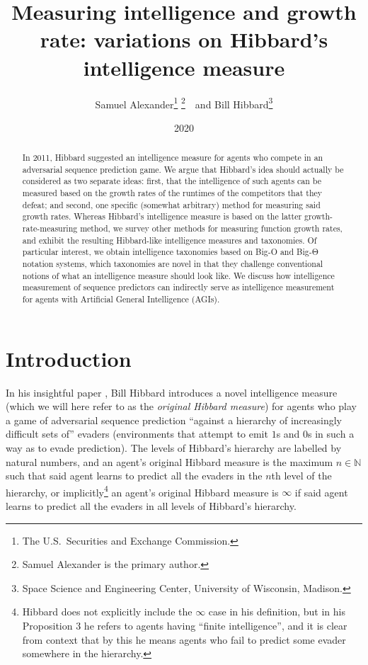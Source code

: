 \documentclass{article}
\title{Measuring intelligence and growth rate: variations on
Hibbard's intelligence measure}
\author{Samuel Alexander\thanks{The U.S.\ Securities and Exchange Commission.}
\thanks{Samuel Alexander is the primary author.}\ \ and Bill Hibbard\thanks{Space Science
and Engineering Center, University of Wisconsin, Madison.}}
\date{2020}
\begin{document}
\maketitle

\begin{abstract}
    In 2011, Hibbard suggested an intelligence measure for agents
    who compete in an adversarial sequence prediction game. We argue
    that Hibbard's idea should actually be considered as two separate
    ideas: first, that the intelligence of such agents can be measured
    based on the growth rates of the runtimes of the competitors that
    they defeat; and second, one specific (somewhat arbitrary) method for measuring said
    growth rates. Whereas Hibbard's intelligence measure is based on the latter
    growth-rate-measuring method, we survey
    other methods for measuring function
    growth rates, and exhibit the resulting Hibbard-like intelligence measures
    and taxonomies. Of particular interest, we obtain intelligence taxonomies
    based on Big-O and Big-Θ notation systems, which taxonomies
    are novel in that they challenge conventional notions of what an
    intelligence measure should look like. We discuss how intelligence measurement
    of sequence predictors can indirectly serve as intelligence measurement for
    agents with Artificial General Intelligence (AGIs).
\end{abstract}

\section{Introduction}

In his insightful paper \cite{hibbard}, Bill Hibbard introduces a novel
intelligence measure (which we will here refer to as the \emph{original Hibbard measure})
for agents who play a game of adversarial sequence prediction
\cite{hibbard2008adversarial}
``against a hierarchy of increasingly difficult sets of'' evaders (environments that attempt
to emit $1$s and $0$s in such a way as to evade prediction).
The levels of Hibbard's hierarchy are labelled by natural numbers, and
an agent's original Hibbard measure is the maximum $n\in\mathbb N$ such that
said agent learns to predict all the evaders in the $n$th level of the hierarchy,
or implicitly\footnote{Hibbard does not explicitly include the $\infty$ case in his
definition, but in his Proposition 3 he refers to agents having ``finite intelligence'', and
it is clear from context that by this he means agents who fail to predict some evader
somewhere in the hierarchy.} an agent's original Hibbard measure is $\infty$
if said agent learns to predict all the evaders in all levels of Hibbard's hierarchy.
\end{document}
